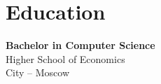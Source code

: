 \documentclass[a4paper,10pt]{article}
\begin{document}
\begin{adjustbox}{valign=t}
\begin{minipage}{0.3\textwidth}
\vfill

\section*{Education}
	\begin{description}
	\raggedright
	\item [\normalfont \textcolor{ColorOne}{2024.}] \textbf{Bachelor in Computer Science}\\
	Higher School of Economics\\
	City -- Moscow
\end{description}

\vfill
\end{minipage}
\end{adjustbox}
%
%
%
\hfill
\begin{adjustbox}{valign=t}
\begin{minipage}{0.05\textwidth} %
\MyVerticalRule  %
\end{minipage}
\end{adjustbox}
\hfill
%
\end{document}

